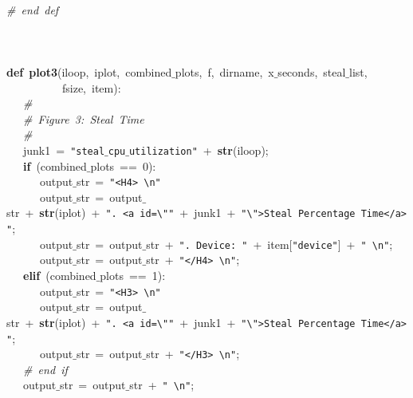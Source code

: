 \mbox{}\ \ \  \\
\mbox{}\textit{\#\ end\ def} \\
\mbox{} \\
\mbox{} \\
\mbox{} \\
\mbox{}\textbf{def}\ \textbf{plot3}(iloop,\ iplot,\ combined$\_$plots,\ f,\ dirname,\ x$\_$seconds,\ steal$\_$list,\  \\
\mbox{}\ \ \ \ \ \ \ \ \ \ fsize,\ item): \\
\mbox{}\ \ \ \textit{\#} \\
\mbox{}\ \ \ \textit{\#\ Figure\ 3:\ Steal\ Time} \\
\mbox{}\ \ \ \textit{\#} \\
\mbox{}\ \ \ junk1\ =\ \texttt{"{}steal$\_$cpu$\_$utilization"{}}\ +\ \textbf{str}(iloop); \\
\mbox{}\ \ \ \textbf{if}\ (combined$\_$plots\ ==\ 0): \\
\mbox{}\ \ \ \ \ \ output$\_$str\ =\ \texttt{"{}\textless{}H4\textgreater{}\ \textbackslash{}n"{}} \\
\mbox{}\ \ \ \ \ \ output$\_$str\ =\ output$\_$str\ +\ \textbf{str}(iplot)\ +\ \texttt{"{}.\ \textless{}a\ id=\textbackslash{}"{}"{}}\ +\ junk1\ +\ \texttt{"{}\textbackslash{}"{}\textgreater{}Steal\ Percentage\ Time\textless{}/a\textgreater{}"{}}; \\
\mbox{}\ \ \ \ \ \ output$\_$str\ =\ output$\_$str\ +\ \texttt{"{}.\ Device:\ "{}}\ +\ item[\texttt{"{}device"{}}]\ +\ \texttt{"{}\ \textbackslash{}n"{}}; \\
\mbox{}\ \ \ \ \ \ output$\_$str\ =\ output$\_$str\ +\ \texttt{"{}\textless{}/H4\textgreater{}\ \textbackslash{}n"{}}; \\
\mbox{}\ \ \ \textbf{elif}\ (combined$\_$plots\ ==\ 1): \\
\mbox{}\ \ \ \ \ \ output$\_$str\ =\ \texttt{"{}\textless{}H3\textgreater{}\ \textbackslash{}n"{}} \\
\mbox{}\ \ \ \ \ \ output$\_$str\ =\ output$\_$str\ +\ \textbf{str}(iplot)\ +\ \texttt{"{}.\ \textless{}a\ id=\textbackslash{}"{}"{}}\ +\ junk1\ +\ \texttt{"{}\textbackslash{}"{}\textgreater{}Steal\ Percentage\ Time\textless{}/a\textgreater{}"{}}; \\
\mbox{}\ \ \ \ \ \ output$\_$str\ =\ output$\_$str\ +\ \texttt{"{}\textless{}/H3\textgreater{}\ \textbackslash{}n"{}}; \\
\mbox{}\ \ \ \textit{\#\ end\ if} \\
\mbox{}\ \ \ output$\_$str\ =\ output$\_$str\ +\ \texttt{"{}\ \textbackslash{}n"{}}; \\
